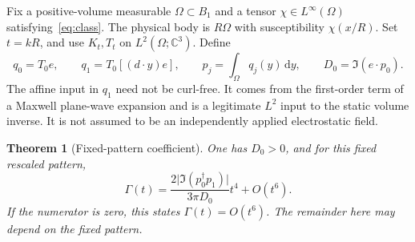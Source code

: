 \documentclass[11pt]{article}
\newtheorem{theorem}{Theorem}[section]
\newcommand{\dd}{\,\mathrm{d}}
\newcommand{\abs}[1]{\lvert #1\rvert}
\begin{document}
Fix a positive-volume measurable $\Omega\subset B_1$ and a tensor $\chi\in L^\infty(\Omega)$ satisfying~\eqref{eq:class}. The physical body is $R\Omega$ with susceptibility $\chi(x/R)$. Set $t=kR$, and use $K_t,T_t$ on $L^2(\Omega;\mathbb C^3)$. Define
\begin{equation}\label{eq:moments}
 q_0=T_0e,\qquad q_1=T_0[(d\cdot y)e],\qquad
 p_j=\int_\Omega q_j(y)\dd y,\qquad D_0=\Im(e\cdot p_0).
\end{equation}
The affine input in $q_1$ need not be curl-free. It comes from the first-order term of a Maxwell plane-wave expansion and is a legitimate $L^2$ input to the static volume inverse. It is not assumed to be an independently applied electrostatic field.

\begin{theorem}[Fixed-pattern coefficient]\label{thm:coefficient}
One has $D_0>0$, and for this fixed rescaled pattern,
\begin{equation}\label{eq:coefficient}
 \Gamma(t)=\frac{2\abs{\Im(p_0^\dagger p_1)}}{3\pi D_0}t^4+O(t^6).
\end{equation}
If the numerator is zero, this states $\Gamma(t)=O(t^6)$. The remainder here may depend on the fixed pattern.
\end{theorem}
\end{document}
